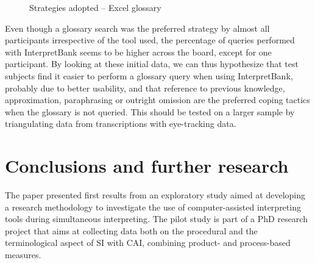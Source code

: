 \documentclass[output=paper]{langsci/langscibook}
\begin{document}
\begin{figure}
\caption{Strategies adopted -- Excel glossary} 
\label{fig:prandi:17}
\end{figure}

Even though a glossary search was the preferred strategy by almost all participants irrespective of the tool used, the percentage of queries performed with InterpretBank seems to be higher across the board, except for one participant. By looking at these initial data, we can thus hypothesize that test subjects find it easier to perform a glossary query when using InterpretBank, probably due to better usability, and that reference to previous knowledge, approximation, paraphrasing or outright omission are the preferred coping tactics when the glossary is not queried. This should be tested on a larger sample by triangulating data from transcriptions with eye-tracking data. 

\section{Conclusions and further research}\label{sec:prandi:6}
The paper presented first results from an exploratory study aimed at developing a research methodology to investigate the use of computer-assisted interpreting tools during simultaneous interpreting. The pilot study is part of a PhD research project that aims at collecting data both on the procedural and the terminological aspect of \textsc{SI} with \textsc{CAI}, combining product- and process-based measures. 
\end{document}
